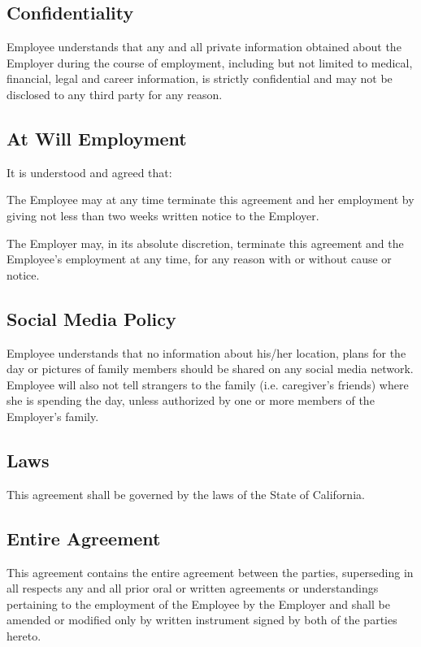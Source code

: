 \documentclass[]{article}
\begin{document}
\begin{enumerate}
\subsection*{Confidentiality}

Employee understands that any and all private information obtained about the Employer during the course of employment, including but not limited to medical, financial, legal and career information, is strictly confidential and may not be disclosed to any third party for any reason.  

\subsection*{At Will Employment}

It is understood and agreed that:

The Employee may at any time terminate this agreement and her employment by giving not less than two weeks written notice to the Employer.

The Employer may, in its absolute discretion, terminate this agreement and the Employee's employment at any time, for any reason with or without cause or notice.

\subsection*{Social Media Policy}

Employee understands that no information about his/her location, plans for the day or pictures of family members should be shared on any social media network. Employee will also not tell strangers to the family (i.e.  caregiver's friends) where she is spending the day, unless authorized by one or more members of the Employer's family.  

\subsection*{Laws}

This agreement shall be governed by the laws of the State of California.

\subsection*{Entire Agreement}

This agreement contains the entire agreement between the parties, superseding in all respects any and all prior oral or written agreements or understandings pertaining to the employment of the Employee by the Employer and shall be amended or modified only by written instrument signed by both of the parties hereto.  


\end{enumerate}
\end{document}
